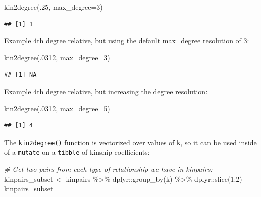 \documentclass[9pt,a4paper,]{extarticle}
\newenvironment{Shaded}{\begin{snugshade}}{\end{snugshade}}
\newcommand{\AttributeTok}[1]{\textcolor[rgb]{0.77,0.63,0.00}{#1}}
\newcommand{\CommentTok}[1]{\textcolor[rgb]{0.56,0.35,0.01}{\textit{#1}}}
\newcommand{\DecValTok}[1]{\textcolor[rgb]{0.00,0.00,0.81}{#1}}
\newcommand{\FunctionTok}[1]{\textcolor[rgb]{0.00,0.00,0.00}{#1}}
\newcommand{\NormalTok}[1]{#1}
\newcommand{\OtherTok}[1]{\textcolor[rgb]{0.56,0.35,0.01}{#1}}
\newcommand{\SpecialCharTok}[1]{\textcolor[rgb]{0.00,0.00,0.00}{#1}}
\begin{document}
\begin{Shaded}
\begin{Highlighting}[]
\FunctionTok{kin2degree}\NormalTok{(.}\DecValTok{25}\NormalTok{, }\AttributeTok{max\_degree=}\DecValTok{3}\NormalTok{)}
\end{Highlighting}
\end{Shaded}

\begin{verbatim}
## [1] 1
\end{verbatim}

Example 4th degree relative, but using the default max\_degree resolution of 3:

\begin{Shaded}
\begin{Highlighting}[]
\FunctionTok{kin2degree}\NormalTok{(.}\DecValTok{0312}\NormalTok{, }\AttributeTok{max\_degree=}\DecValTok{3}\NormalTok{)}
\end{Highlighting}
\end{Shaded}

\begin{verbatim}
## [1] NA
\end{verbatim}

Example 4th degree relative, but increasing the degree resolution:

\begin{Shaded}
\begin{Highlighting}[]
\FunctionTok{kin2degree}\NormalTok{(.}\DecValTok{0312}\NormalTok{, }\AttributeTok{max\_degree=}\DecValTok{5}\NormalTok{)}
\end{Highlighting}
\end{Shaded}

\begin{verbatim}
## [1] 4
\end{verbatim}

The \texttt{kin2degree()} function is vectorized over values of \texttt{k}, so it can be used inside of a \texttt{mutate} on a \texttt{tibble} of kinship coefficients:

\begin{Shaded}
\begin{Highlighting}[]
\CommentTok{\# Get two pairs from each type of relationship we have in kinpairs:}
\NormalTok{kinpairs\_subset }\OtherTok{\textless{}{-}} 
\NormalTok{  kinpairs }\SpecialCharTok{\%\textgreater{}\%} 
\NormalTok{  dplyr}\SpecialCharTok{::}\FunctionTok{group\_by}\NormalTok{(k) }\SpecialCharTok{\%\textgreater{}\%} 
\NormalTok{  dplyr}\SpecialCharTok{::}\FunctionTok{slice}\NormalTok{(}\DecValTok{1}\SpecialCharTok{:}\DecValTok{2}\NormalTok{)}
\NormalTok{kinpairs\_subset}
\end{Highlighting}
\end{Shaded}
\end{document}

